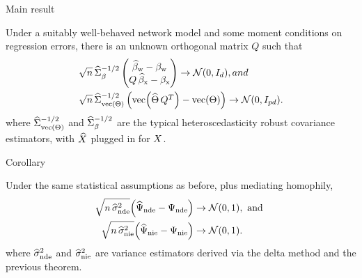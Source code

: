 \documentclass[aspectratio=169]{beamer}
\theoremstyle{remark}
\begin{document}
\begin{frame}{Main result}

    \begin{theorem}

        \vspace{2mm}

        Under a suitably well-behaved network model and some moment conditions on regression errors, there is an unknown orthogonal matrix $Q$ such that
        \begin{equation*}
            \begin{aligned}
                \sqrt{ n } \,
                 & \Sigmahatbeta^{-1/2}
                \begin{pmatrix}
                    \betawhat - \betaw \\
                    Q \, \betaxhat - \betax
                \end{pmatrix}
                \to
                \Normal{0}{I_d}, and     \\
                \sqrt{ n } \,
                 & \Sigmahattheta^{-1/2}
                \begin{pmatrix}
                    \vecc \paren*{\Thetahat \, Q^T} - \Thetavec
                \end{pmatrix}
                \to
                \Normal{0}{I_{p d}}.
            \end{aligned}
        \end{equation*}
        \noindent where $\widehat{\Sigma}_{\operatorname*{vec} \left(\Theta\right)}^{-1/2}$ and $\widehat{\Sigma}_\beta^{-1/2}$ are the typical heteroscedasticity robust covariance estimators, with $\widehat{X}$ plugged in for $X$.
    \end{theorem}
\end{frame}

\begin{frame}{Corollary}

    \begin{theorem}

        \vspace{2mm}

        Under the same statistical assumptions as before, plus mediating homophily,
        \begin{align*}
            \sqrt{n \, \sigmahatnde} \paren*{\ndehat - \nde}
             & \to
            \Normal{0}{1}, \text { and } \\
            \sqrt{n \, \sigmahatnie} \paren*{\niehat - \nie}
             & \to
            \Normal{0}{1}.
        \end{align*}
        \noindent where $\widehat{\sigma}^2_\mathrm{nde}$ and $\widehat{\sigma}^2_\mathrm{nie}$ are variance estimators derived via the delta method and the previous theorem.

    \end{theorem}

\end{frame}
\end{document}
